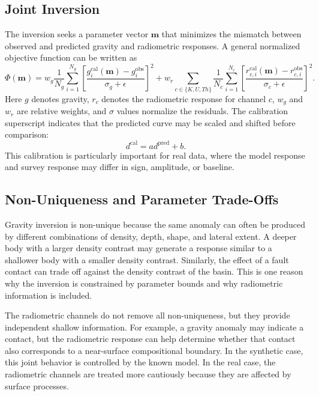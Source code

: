 \documentclass[12pt,a4paper]{article}
\begin{document}
\subsection{Joint Inversion}
The inversion seeks a parameter vector $\mathbf{m}$ that minimizes the mismatch between observed and predicted gravity and radiometric responses. A general normalized objective function can be written as
\begin{equation}
    \Phi(\mathbf{m})
    =
    w_g
    \frac{1}{N_g}
    \sum_{i=1}^{N_g}
    \left[
    \frac{g_i^{\mathrm{cal}}(\mathbf{m}) - g_i^{\mathrm{obs}}}
    {\sigma_g + \epsilon}
    \right]^2
    +
    w_r
    \sum_{c\in\{K,U,Th\}}
    \frac{1}{N_c}
    \sum_{i=1}^{N_c}
    \left[
    \frac{r_{c,i}^{\mathrm{cal}}(\mathbf{m}) - r_{c,i}^{\mathrm{obs}}}
    {\sigma_c + \epsilon}
    \right]^2 .
\end{equation}
Here $g$ denotes gravity, $r_c$ denotes the radiometric response for channel $c$, $w_g$ and $w_r$ are relative weights, and $\sigma$ values normalize the residuals. The calibration superscript indicates that the predicted curve may be scaled and shifted before comparison:
\begin{equation}
    d^{\mathrm{cal}} = a d^{\mathrm{pred}} + b .
\end{equation}
This calibration is particularly important for real data, where the model response and survey response may differ in sign, amplitude, or baseline.

\subsection{Non-Uniqueness and Parameter Trade-Offs}
Gravity inversion is non-unique because the same anomaly can often be produced by different combinations of density, depth, shape, and lateral extent. A deeper body with a larger density contrast may generate a response similar to a shallower body with a smaller density contrast. Similarly, the effect of a fault contact can trade off against the density contrast of the basin. This is one reason why the inversion is constrained by parameter bounds and why radiometric information is included.

The radiometric channels do not remove all non-uniqueness, but they provide independent shallow information. For example, a gravity anomaly may indicate a contact, but the radiometric response can help determine whether that contact also corresponds to a near-surface compositional boundary. In the synthetic case, this joint behavior is controlled by the known model. In the real case, the radiometric channels are treated more cautiously because they are affected by surface processes.
\end{document}
